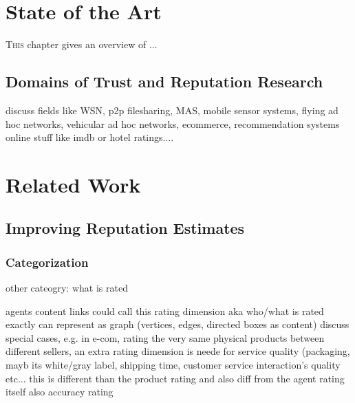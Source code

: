 \documentclass[%
    ]{\PathToTumTemplate/thesis/tum_thesis}
\begin{document}
\chapter{State of the Art}\label{chap:sota}

\lettrine{T}{his} chapter gives an overview of ... 


\section{Domains of Trust and Reputation Research}

discuss fields like WSN, \gls{p2p} filesharing, MAS, mobile sensor systems, flying ad hoc networks, vehicular ad hoc networks, ecommerce, recommendation systems online stuff like imdb or hotel ratings....






\chapter{Related Work}\label{chap:related_work}


\section{Improving Reputation Estimates}\label{sec:estimate_improvements}

\subsection{Categorization}

other cateogry: what is rated


agents 
content
links
could call this rating dimension aka who/what is rated exactly
can represent as graph (vertices, edges, directed boxes as content)
discuss special cases, e.g. in e-com, rating the very same physical products between different sellers, an extra rating dimension is neede for service quality (packaging, mayb its white/gray label, shipping time, customer service interaction's quality etc... this is different than the product rating and also diff from the agent rating itself
also accuracy rating
\end{document}
